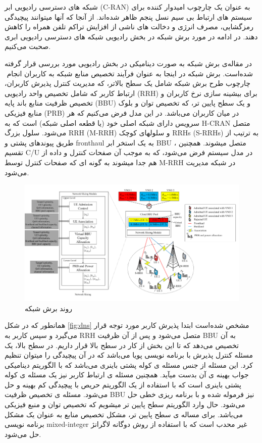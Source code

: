 شبکه های دسترسی رادیویی ابر (C-RAN) به عنوان یک چارچوب امیدوار کننده برای سیستم های ارتباط بی سیم نسل پنجم ظاهر شده‌اند.
از آنجا که آنها میتوانند پیچیدگی رمزگشایی، مصرف انرژی و دخالت های ناشی از افزایش تراکم تلفن همراه را کاهش دهند\cite{cranInt}.
در ادامه در مورد برش شبکه در بخش رادیویی شبکه های دسترسی رادیویی ابری صحبت می‌کنیم.

در مقاله‌ی \cite{lee2018dynamic}
برش شبکه به صورت دینامیکی در بخش رادیویی مورد بررسی قرار گرفته شده‌است.
برش شبکه در اینجا به عنوان فرآیند تخصیص منابع شبکه به کاربران انجام ‌
چارچوب طرح برش شبکه شامل یک سطح بالاتر، که مدیریت کنترل پذیرش کاربران، ارتباط کاربر که شامل تخصیص واحد رادیویی (RRH) برای بیشینه سازی نرخ کاربران و تخصیص ظرفیت منابع باند پایه (‌BBU) و یک سطح پایین تر، که تخصیص توان و بلوک منابع فیزیکی (PRB) در میان کاربران می‌باشد.
در این مدل فرض می‌کنیم که هر سرویس دارای شبکه اصلی خود (یا قطعه اصلی شبکه) است که به H-CRAN متصل می‌شود.
سلول بزرگ RRH (M-RRH) و سلولهای کوچک RRHs (S-RRHs) به ترتیب از طریق پیوندهای پشتی و fronthaul به یک استخر ابر
BBU  متصل میشوند.
همچنین ، تقسیم C/U در مدل سیستم فرض می‌شود، که به موجب آن صفحات کنترل و داده از هم جدا میشوند به گونه ای که صفحات کنترل توسط M-RRH در شبکه مدیریت می‌شود.
\begin{figure}%
  \centering
    \includegraphics[scale = 0.7]{./fig/dynamicNS}
  \caption{روند برش شبکه\ \cite{lee2018dynamic}}
  \label{fig:dns}
\end{figure}
همانطور که در شکل \eqref{fig:dns} 
مشخص شده‌است ابتدا پذیرش کاربر مورد توجه قرار می‌گیرد و سپس کاربر به RRH متصل می‌شود و پس از آن ظرفیت BBU به آن تخصیص می‌دهد که تا این بخش از کار در سطح بالا قرار داریم.
در سطح بالا، یک مسئله کنترل پذیرش با برنامه نویسی پویا می‌باشد که در آن پیچیدگی را میتوان تنظیم کرد.
این مسئله از جنس مسئله ی
کوله پشتی 
باینری
 می‌باشد که با الگوریتم دینامیکی جواب بهینه ی آن بدست میآید.
همچنین مسئله ی ارتباط کاربر نیز یک مسئله ی کوله پشتی باینری است که با استفاده از یک الگوریتم حریص با پیچیدگی کم بهینه و حل می‌شود.
 مسئله ی تخصیص ظرفیت BBU نیز فرموله شده و با برنامه ریزی خطی حل می‌شود.
 حال وارد الگوریتم سطح پایین تر میشویم که تخصیص توان و منبع فیزیکی می‌باشد.
برای مساله ی سطح پایین تر، مشکل تخصیص منابع به عنوان یک مشکل برنامه نویسی mixed-integer غیر محدب است که با استفاده از روش دوگانه لاگرانژ حل می‌شود.

